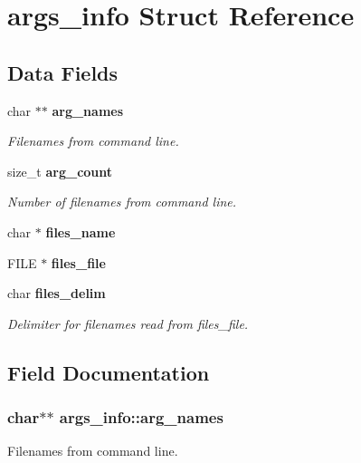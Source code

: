\section{args\-\_\-info Struct Reference}
\label{structargs__info}
\subsection*{Data Fields}
\begin{DoxyCompactItemize}
\item 
char $\ast$$\ast$ {\bf arg\-\_\-names}
\begin{DoxyCompactList}\small\item\em Filenames from command line. \end{DoxyCompactList}\item 
size\-\_\-t {\bf arg\-\_\-count}
\begin{DoxyCompactList}\small\item\em Number of filenames from command line. \end{DoxyCompactList}\item 
char $\ast$ {\bf files\-\_\-name}
\item 
F\-I\-L\-E $\ast$ {\bf files\-\_\-file}
\item 
char {\bf files\-\_\-delim}
\begin{DoxyCompactList}\small\item\em Delimiter for filenames read from files\-\_\-file. \end{DoxyCompactList}\end{DoxyCompactItemize}


\subsection{Field Documentation}
\subsubsection[{arg\-\_\-names}]{\setlength{\rightskip}{0pt plus 5cm}char$\ast$$\ast$ args\-\_\-info\-::arg\-\_\-names}\label{structargs__info_a9d647873446a849c7c06def495195a35}


Filenames from command line. 

